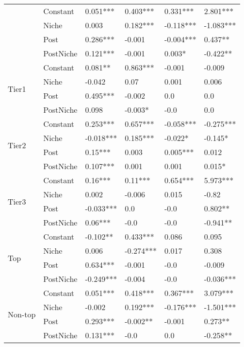 \begin{longtable}[h!]{llllll}
\bottomrule
\endlastfoot
\multirow{4}{*}{Full} & Constant &            0.051*** &    0.403*** &   0.331*** &   2.801*** \\
        & Niche &               0.003 &    0.182*** &  -0.118*** &  -1.083*** \\
        & Post &            0.286*** &      -0.001 &  -0.004*** &    0.437** \\
        & PostNiche &            0.121*** &      -0.001 &     0.003* &   -0.422** \\
\cline{1-6}
\multirow{4}{*}{Tier1} & Constant &             0.081** &    0.863*** &     -0.001 &     -0.009 \\
        & Niche &              -0.042 &        0.07 &      0.001 &      0.006 \\
        & Post &            0.495*** &      -0.002 &        0.0 &        0.0 \\
        & PostNiche &               0.098 &     -0.003* &       -0.0 &        0.0 \\
\cline{1-6}
\multirow{4}{*}{Tier2} & Constant &            0.253*** &    0.657*** &  -0.058*** &  -0.275*** \\
        & Niche &           -0.018*** &    0.185*** &    -0.022* &    -0.145* \\
        & Post &             0.15*** &       0.003 &   0.005*** &      0.012 \\
        & PostNiche &            0.107*** &       0.001 &      0.001 &     0.015* \\
\cline{1-6}
\multirow{4}{*}{Tier3} & Constant &             0.16*** &     0.11*** &   0.654*** &   5.973*** \\
        & Niche &               0.002 &      -0.006 &      0.015 &      -0.82 \\
        & Post &           -0.033*** &         0.0 &       -0.0 &    0.802** \\
        & PostNiche &             0.06*** &        -0.0 &       -0.0 &   -0.941** \\
\cline{1-6}
\multirow{4}{*}{Top} & Constant &            -0.102** &    0.433*** &      0.086 &      0.095 \\
        & Niche &               0.006 &   -0.274*** &      0.017 &      0.308 \\
        & Post &            0.634*** &      -0.001 &       -0.0 &     -0.009 \\
        & PostNiche &           -0.249*** &      -0.004 &       -0.0 &  -0.036*** \\
\cline{1-6}
\multirow{4}{*}{Non-top} & Constant &            0.051*** &    0.418*** &   0.367*** &   3.079*** \\
        & Niche &              -0.002 &    0.192*** &  -0.176*** &  -1.501*** \\
        & Post &            0.293*** &    -0.002** &     -0.001 &    0.273** \\
        & PostNiche &            0.131*** &        -0.0 &        0.0 &   -0.258** \\
\end{longtable}
